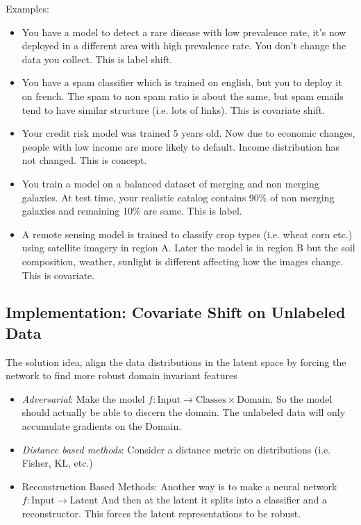 \begin{sidework}
	Examples:
	\begin{itemize}
	\item You have a model to detect a rare disease with low prevalence rate, it's now deployed in a different area with high prevalence rate. You don't change the data you collect. This is label shift.
	\item You have a spam classifier which is trained on english, but you to deploy it on french. The spam to non spam ratio is about the same, but spam emails tend to have similar structure (i.e. lots of links). This is covariate shift.
	\item Your credit risk model was trained 5 years old. Now due to economic changes, people with low income are more likely to default. Income distribution has not changed. This is concept.
	\item You train a model on a balanced dataset of merging and non merging galaxies. At test time, your realistic catalog contains 90\% of non merging galaxies and remaining 10\% are same. This is label.
	\item A remote sensing model is trained to classify crop types (i.e. wheat corn etc.) using satellite imagery in region A. Later the model is in region B but the soil composition, weather, sunlight is different affecting how the images change. This is covariate.
\end{itemize}
\end{sidework}

\subsection{Implementation: Covariate Shift on Unlabeled Data}
The solution idea, align the data distributions in the latent space by forcing the network to find more robust domain invariant features
\begin{itemize}
	\item \emph{Adversarial}: Make the model $f: \text{Input} \to \text{Classes} \times \text{Domain}$. So the model should actually be able to discern the domain. The unlabeled data will only accumulate gradients on the Domain.
	
	

	\item \emph{Distance based methods}: 	 Consider a distance metric on distributions (i.e. Fisher, KL, etc.)
	\item Reconstruction Based Methods: Another way is to make a neural network $f: \text{Input} \to \text{Latent}$ And then at the latent it splits into a classifier and a reconstructor. This forces the latent representations to be robust.
\end{itemize} 

